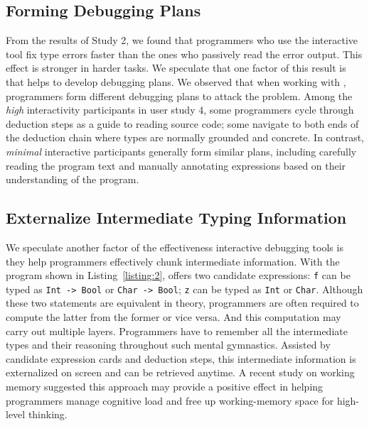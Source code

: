 \subsection{Forming Debugging Plans}
From the results of Study 2, we found that programmers who use the interactive tool fix type errors faster than the ones who passively read the error output. This effect is stronger in harder tasks. We speculate that one factor of this result is that  \chameleon{} helps to develop debugging plans. We observed that when working with \chameleon{}, programmers form different debugging plans to attack the problem. Among the \textit{high} interactivity participants in user study 4, some programmers cycle through deduction steps as a guide to reading source code; some navigate to both ends of the deduction chain where types are normally grounded and concrete. In contrast, \textit{minimal} interactive participants generally form similar plans, including carefully reading the program text and manually annotating expressions based on their understanding of the program.


\subsection{Externalize Intermediate Typing Information}
We speculate another factor of the effectiveness \chameleon{} interactive debugging tools is they help programmers effectively chunk intermediate information. With the program shown in Listing~\ref{listing:2}, \chameleon{} offers two candidate expressions: \texttt{f} can be typed as \texttt{Int -> Bool} or \texttt{Char -> Bool}; \texttt{z} can be typed as \texttt{Int} or \texttt{Char}. Although  these two statements are equivalent in theory, programmers are often required to compute the latter from the former or vice versa. And this computation may carry out multiple layers. Programmers have to remember all the intermediate types and their reasoning throughout such mental gymnastics. Assisted by candidate expression cards and deduction steps, this intermediate information is externalized on screen and can be retrieved anytime. A recent study on working memory \cite{crichton_role_2021} suggested this approach may provide a positive effect in helping programmers manage cognitive load and free up working-memory space for high-level thinking.



